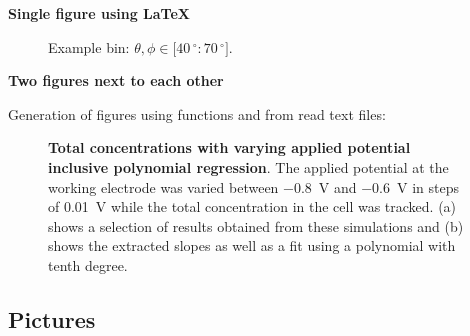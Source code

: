 		\textbf{Single figure using LaTeX}
		\begin{figure}[H]%
			\centering
			\subfloat{}%
			\caption[Example bin: $\theta,\phi \in \lbrack40\,^\circ:70\,^\circ\rbrack$]{Example bin: $\theta,\phi \in \lbrack 40\,^\circ:70\,^\circ\rbrack$.}
			\label{fig:sec2.example_bin_backscatter}
		\end{figure}

		\textbf{Two figures next to each other}

		Generation of figures using functions and from read text files:
		\begin{figure}[H]%
			\hspace{\initDistDblImg}	%
			\hspace{3mm}				%
			\centering
			\subfloat[\label{fig:sec2.simple_test_cell_time_dep_study_OCV_extract_left}]
				{}%
			\hspace{\distDblImgBetween}
			\hspace{5mm}				%
			\subfloat[\label{fig:sec2.simple_test_cell_time_dep_study_OCV_extract_right}]
				{}%
			\caption[Total concentrations with varying applied potential incl. polynomial regression]{\textbf{Total concentrations with varying applied potential inclusive polynomial \mbox{regression}}. The applied potential at the working electrode was varied between \SI{-0.8}{\volt} and \SI{-0.6}{\volt} in steps of \SI{0.01}{\volt} while the total concentration in the cell was tracked. (a) shows a selection of results obtained from these simulations and (b) shows the extracted slopes as well as a fit using a polynomial with tenth degree.}
			\label{fig:sec2.simple_test_cell_time_dep_study_OCV_extract_both}
		\end{figure}

	\clearpage
	\subsection{Pictures}

